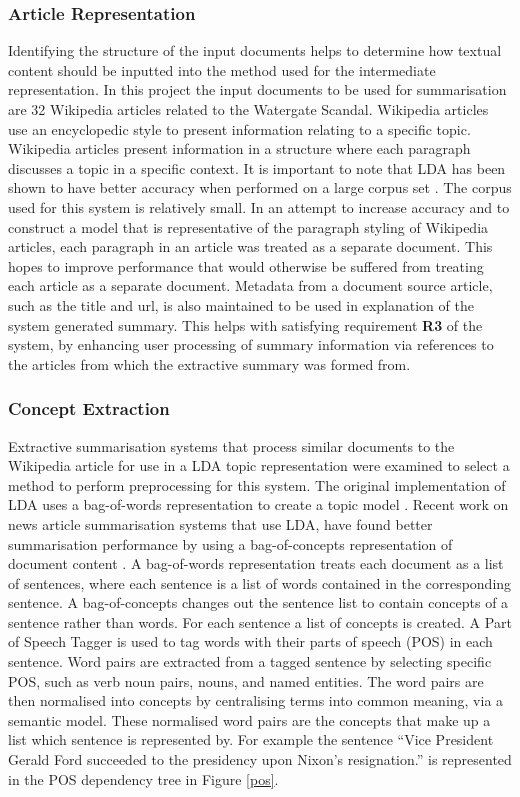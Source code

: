 \subsubsection{Article Representation}
Identifying the structure of the input documents helps to determine how textual content should be inputted into the method used for the intermediate representation. In this project the input documents to be used for summarisation are 32 Wikipedia articles related to the Watergate Scandal. Wikipedia articles use an encyclopedic style to present information relating to a specific topic. Wikipedia articles present information in a structure where each paragraph discusses a topic in a specific context. It is important to note that LDA has been shown to have better accuracy when performed on a large corpus set \citep{crossley2017important}. The corpus used for this system is relatively small. In an attempt to increase accuracy and to construct a model that is representative of the paragraph styling of Wikipedia articles, each paragraph in an article was treated as a separate document. This hopes to improve performance that would otherwise be suffered from treating each article as a separate document. Metadata from a document source article, such as the title and url, is also maintained to be used in explanation of the system generated summary. This helps with satisfying requirement \textbf{R3} of the system, by enhancing user processing of summary information via references to the articles from which the extractive summary was formed from.

\subsubsection{Concept Extraction}
Extractive summarisation systems that process similar documents to the Wikipedia article for use in a LDA topic representation were examined to select a method to perform preprocessing for this system. The original implementation of LDA uses a bag-of-words representation to create a topic model \citep{blei2003latent}. Recent work on news article summarisation systems that use LDA, have found better summarisation performance by using a bag-of-concepts representation of document content \citep{rajagopal2013commonsense,li2016cross,raviv2016document}. A bag-of-words representation treats each document as a list of sentences, where each sentence is a list of words contained in the corresponding sentence. A bag-of-concepts changes out the sentence list to contain concepts of a sentence rather than words. For each sentence a list of concepts is created. A Part of Speech Tagger is used to tag words with their parts of speech (POS) in each sentence. Word pairs are extracted from a tagged sentence by selecting specific POS, such as verb noun pairs, nouns, and named entities. The word pairs are then normalised into concepts by centralising terms into common meaning, via a semantic model. These normalised word pairs are the concepts that make up a list which sentence is represented by. For example the sentence “Vice President Gerald Ford succeeded to the presidency upon Nixon's resignation.” is represented in the POS dependency tree in Figure \ref{pos}. 

